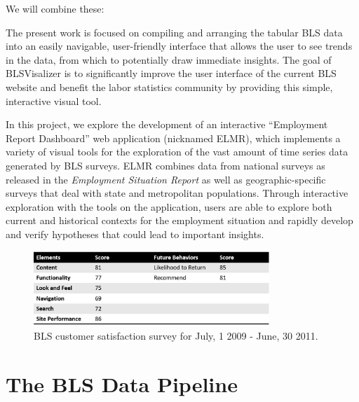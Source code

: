\documentclass[journal]{IEEEtran}
\newcommand\Peter[1]{{\color{red}#1}}	%
\newcommand\Ben[1]{{\color{blue}#1}}		%
\begin{document}
We will combine these:

\Peter{The present work is focused on compiling and arranging the tabular BLS data into an easily navigable, user-friendly interface that allows the user to see trends in the data, from which to potentially draw immediate insights. The goal of BLSVisalizer is to significantly improve the user interface of the current BLS website and benefit the labor statistics community by providing this simple, interactive visual tool.}

 \Ben{In this project, we explore the development of an interactive ``Employment Report Dashboard'' web application (nicknamed ELMR), which implements a variety of visual tools for the exploration of the vast amount of time series data generated by BLS surveys. ELMR combines data from national surveys as released in the \textit{Employment Situation Report} as well as geographic-specific surveys that deal with state and metropolitan populations. Through interactive exploration with the tools on the application, users are able to explore both current and historical contexts for the employment situation and rapidly develop and verify hypotheses that could lead to important insights.}

\begin{figure}[t]
    \includegraphics[width = 3.5in]{BLSSurvey_ppt.png}
    \caption{BLS customer satisfaction survey for July, 1 2009 - June, 30 2011.}
    \label{CustSat}
\end{figure}   

\section{The BLS Data Pipeline}
\end{document}
